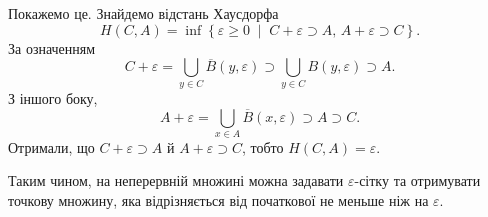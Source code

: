 Покажемо це.
Знайдемо відстань Хаусдорфа
\begin{equation*}
  H \left( C, A \right) =
  \inf \left\{
    \varepsilon \geq 0 \; \middle| \;
    C + \varepsilon \supset A, \, A + \varepsilon \supset C
  \right\}.
\end{equation*}
За означенням
\begin{equation*}
  C + \varepsilon =
  \bigcup \limits_{y \in C} \overline{B} \left( y, \varepsilon \right) \supset
  \bigcup \limits_{y \in C} B \left( y, \varepsilon \right) \supset
  A.
\end{equation*}
З іншого боку,
\begin{equation*}
  A + \varepsilon =
  \bigcup \limits_{x \in A} \overline{B} \left( x, \varepsilon \right) \supset
  A \supset C.
\end{equation*}
Отримали, що $C + \varepsilon \supset A$ й $A + \varepsilon \supset C$,
тобто $H \left( C, A \right) = \varepsilon$.

Таким чином, на неперервній множині можна задавати
$\varepsilon$-сітку та отримувати точкову множину,
яка відрізняється від початкової не меньше ніж на $\varepsilon$.
